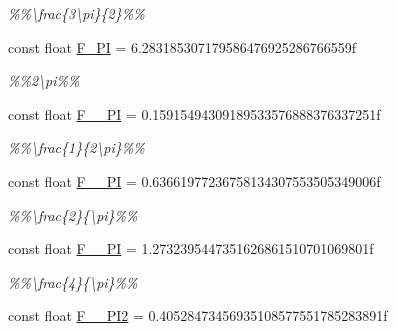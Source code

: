 \begin{DoxyCompactItemize}
\begin{DoxyCompactList}\small\item\em \%\%\textbackslash{}frac\{3\textbackslash{}pi\}\{2\}\%\% \end{DoxyCompactList}\item 
\hypertarget{group___scalar_math_consts_ga1f732c1484129c0ec49718665c5334a9}{}const float \hyperlink{group___scalar_math_consts_ga1f732c1484129c0ec49718665c5334a9}{F\+\_\+P\+I} = 6.\+283185307179586476925286766559f\label{group___scalar_math_consts_ga1f732c1484129c0ec49718665c5334a9}

\begin{DoxyCompactList}\small\item\em \%\%2\textbackslash{}pi\%\% \end{DoxyCompactList}\item 
\hypertarget{group___scalar_math_consts_ga1e7d6dc0fa11f4284b6f0eaa5b08a351}{}const float \hyperlink{group___scalar_math_consts_ga1e7d6dc0fa11f4284b6f0eaa5b08a351}{F\+\_\+\_\+P\+I} = 0.\+15915494309189533576888376337251f\label{group___scalar_math_consts_ga1e7d6dc0fa11f4284b6f0eaa5b08a351}

\begin{DoxyCompactList}\small\item\em \%\%\textbackslash{}frac\{1\}\{2\textbackslash{}pi\}\%\% \end{DoxyCompactList}\item 
\hypertarget{group___scalar_math_consts_gaaf7b5cfd9c005c51df9c94cbfeb77b2c}{}const float \hyperlink{group___scalar_math_consts_gaaf7b5cfd9c005c51df9c94cbfeb77b2c}{F\+\_\+\_\+\+P\+I} = 0.\+63661977236758134307553505349006f\label{group___scalar_math_consts_gaaf7b5cfd9c005c51df9c94cbfeb77b2c}

\begin{DoxyCompactList}\small\item\em \%\%\textbackslash{}frac\{2\}\{\textbackslash{}pi\}\%\% \end{DoxyCompactList}\item 
\hypertarget{group___scalar_math_consts_ga17543086409760281a83ba571b38eda4}{}const float \hyperlink{group___scalar_math_consts_ga17543086409760281a83ba571b38eda4}{F\+\_\+\_\+\+P\+I} = 1.\+2732395447351626861510701069801f\label{group___scalar_math_consts_ga17543086409760281a83ba571b38eda4}

\begin{DoxyCompactList}\small\item\em \%\%\textbackslash{}frac\{4\}\{\textbackslash{}pi\}\%\% \end{DoxyCompactList}\item 
\hypertarget{group___scalar_math_consts_ga6e0a91cbc33147860a0af980969f00aa}{}const float \hyperlink{group___scalar_math_consts_ga6e0a91cbc33147860a0af980969f00aa}{F\+\_\+\_\+\+P\+I2} = 0.\+40528473456935108577551785283891f\label{group___scalar_math_consts_ga6e0a91cbc33147860a0af980969f00aa}


\end{DoxyCompactItemize}
